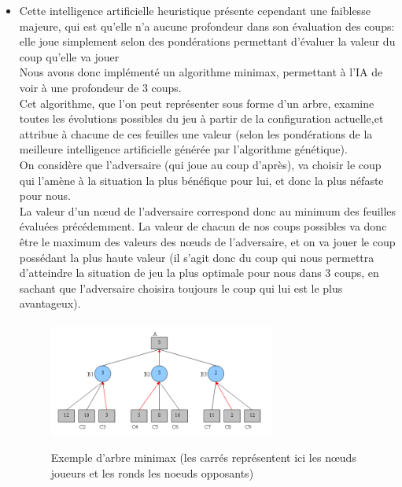 \documentclass[10pt]{article}
\begin{document}
\begin{enumerate}
\begin{itemize}
\paragraph{}
\item Cette intelligence artificielle heuristique présente cependant une faiblesse majeure, qui est qu'elle n'a aucune profondeur dans son évaluation des coups: elle joue simplement selon des pondérations permettant d'évaluer la valeur du coup qu'elle va jouer \\
Nous avons donc implémenté un algorithme minimax, permettant à l'IA de voir à une profondeur de 3 coups. \\
Cet algorithme, que l'on peut représenter sous forme d'un arbre, examine toutes les évolutions possibles du jeu à partir de la configuration actuelle,et attribue à chacune de ces feuilles une valeur (selon les pondérations de la meilleure intelligence artificielle générée par l'algorithme génétique). \\
On considère que l'adversaire (qui joue au coup d'après), va choisir le coup qui l'amène à la situation la plus bénéfique pour lui, et donc la plus néfaste pour nous. \\
La valeur d'un nœud de l'adversaire correspond donc au minimum des feuilles évaluées précédemment. La valeur de chacun de nos coups possibles va donc être le maximum des valeurs des nœuds de l'adversaire, et on va jouer le coup possédant la plus haute valeur (il s'agit donc du coup qui nous permettra d'atteindre la situation de jeu la plus optimale pour nous dans 3 coups, en sachant que l'adversaire choisira toujours le coup qui lui est le plus avantageux).

\paragraph{}
\begin{figure}[h!]
\centering
\includegraphics[width=0.7\textwidth]{minimax.png}
\caption{ }{Exemple d'arbre minimax (les carrés représentent ici les nœuds joueurs et les ronds les noeuds opposants)}
\end{figure}



\end{itemize}
\end{enumerate}
\end{document}
